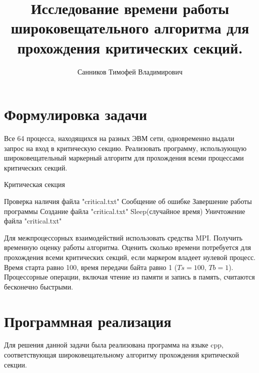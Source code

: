 \documentclass[openany, twoside, a4paper, 12pt]{extbook}
\author{Санников Тимофей Владимирович}
\title{Исследование времени работы широковещательного алгоритма для прохождения критических секций.}
\begin{document}
	\maketitle

	\section*{Формулировка задачи}
	Все 64 процесса, находящихся на разных ЭВМ сети,
	одновременно выдали запрос на вход в критическую секцию.
	Реализовать программу,
	использующую широковещательный маркерный алгоритм для прохождения всеми процессами критических секций.
	
	\begin{algorithm}[b]
		\caption{Критическая секция}
		\begin{algorithmic}[1]
		    \STATE Проверка наличия файла "critical.txt"
		        \STATE Сообщение об ошибке
		        \STATE Завершение работы программы
		    \ELSE
		        \STATE Создание файла "critical.txt"
		        \STATE Sleep(случайное время)
		        \STATE Уничтожение файла "critical.txt"
		    \ENDIF
		\end{algorithmic}
	\end{algorithm}

	Для межпроцессорных взаимодействий использовать средства MPI.\@
	Получить временную оценку работы алгоритма.
	Оценить сколько времени потребуется для прохождения всеми критических секций,
	если маркером владеет нулевой процесс.
	Время старта равно 100, время передачи байта равно 1 ($ Ts=100 $, $ Tb=1 $).
	Процессорные операции, включая чтение из памяти и запись в память,
	считаются бесконечно быстрыми.

	\section*{Программная реализация}
	Для решения данной задачи была реализована программа на языке cpp, соответствующая
	широковещательному алгоритму прохождения критической секции.
\end{document}
